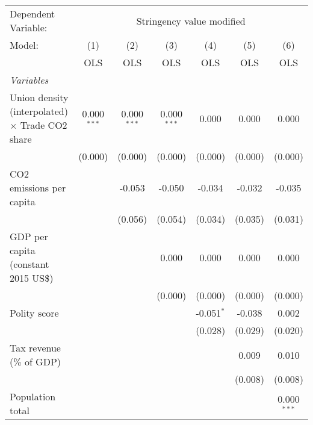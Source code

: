 
\begingroup
\centering
\begin{tabular}{lcccccc}
   \toprule
   Dependent Variable: & \multicolumn{6}{c}{Stringency value modified}\\
   Model:                                                 & (1)           & (2)           & (3)           & (4)          & (5)     & (6)\\  
                                                          &  OLS          & OLS           & OLS           & OLS          & OLS     & OLS\\  
   \midrule
   \emph{Variables}\\
   Union density (interpolated) $\times$ Trade CO2 share  & 0.000$^{***}$ & 0.000$^{***}$ & 0.000$^{***}$ & 0.000        & 0.000   & 0.000\\   
                                                          & (0.000)       & (0.000)       & (0.000)       & (0.000)      & (0.000) & (0.000)\\   
   CO2 emissions per capita                               &               & -0.053        & -0.050        & -0.034       & -0.032  & -0.035\\   
                                                          &               & (0.056)       & (0.054)       & (0.034)      & (0.035) & (0.031)\\   
   GDP per capita (constant 2015 US\$)                    &               &               & 0.000         & 0.000        & 0.000   & 0.000\\   
                                                          &               &               & (0.000)       & (0.000)      & (0.000) & (0.000)\\   
   Polity score                                           &               &               &               & -0.051$^{*}$ & -0.038  & 0.002\\   
                                                          &               &               &               & (0.028)      & (0.029) & (0.020)\\   
   Tax revenue (\% of GDP)                                &               &               &               &              & 0.009   & 0.010\\   
                                                          &               &               &               &              & (0.008) & (0.008)\\   
   Population total                                       &               &               &               &              &         & 0.000$^{***}$\\   

\end{tabular}

